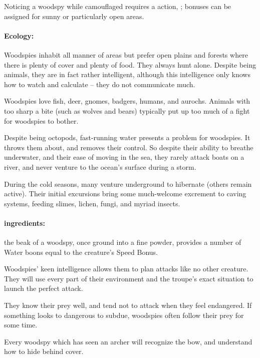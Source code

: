 \begin{multicols}{2}
Noticing a woodspy while camouflaged requires a  action, \tn[14]; bonuses can be assigned for sunny or particularly open areas.

\woodspy

\paragraph{Ecology:} Woodspies inhabit all manner of areas but prefer open plains and forests where there is plenty of cover and plenty of food.  They always hunt alone.  Despite being animals, they are in fact rather intelligent, although this intelligence only knows how to watch and calculate -- they do not communicate much.

Woodspies love fish, deer, gnomes, badgers, humans, and aurochs.
Animals with too sharp a bite (such as wolves and bears) typically put up too much of a fight for woodspies to bother.

Despite being octopods, fast-running water presents a problem for woodspies.
It throws them about, and removes their control.
So despite their ability to breathe underwater, and their ease of moving in the sea, they rarely attack boats on a river, and never venture to the ocean's surface during a storm.

During the cold seasons, many venture underground to hibernate (others remain active).
Their initial excursions bring some much-welcome excrement to caving systems, feeding slimes, lichen, fungi, and myriad insects.

\paragraph{\Glspl{ingredient}:}
the beak of a woodspy, once ground into a fine powder, provides a number of Water \glspl{boon} equal to the creature's Speed Bonus.

\showEnc[E]

Woodspies' keen intelligence allows them to plan attacks like no other creature.
They will use every part of their environment and the troupe's exact situation to launch the perfect attack.

They know their prey well, and tend not to attack when they feel endangered.
If something looks to dangerous to subdue, woodspies often follow their prey for some time.

Every woodspy which has seen an archer will recognize the bow, and understand how to hide behind cover.


\end{multicols}

